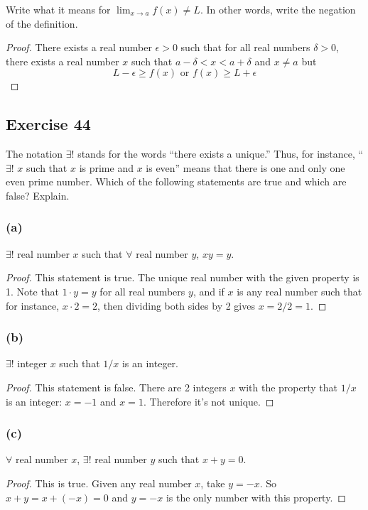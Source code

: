 \documentclass[14pt]{extarticle}
\newcommand{\fa}{\forall}
\newcommand{\te}{\exists}
\begin{document}
Write what it means for $\lim_{x \to a} f(x) \neq L$. In other words, write the negation of the definition.

\begin{proof}
    There exists a real number $\epsilon > 0$ such that for all real numbers $\delta > 0$, there exists a real number $x$ such that $a - \delta < x < a + \delta$ and $x \neq a$ but
    $$
        L - \epsilon \geq f(x) \text{  or  } f(x) \geq L + \epsilon
    $$
\end{proof}

\subsection{Exercise 44}
The notation $\te$! stands for the words “there exists a unique.” Thus, for instance, “$\te$! $x$ such that $x$ is prime and $x$ is even” means that there is one and only one even prime number. Which of the following statements are true and which are false? Explain.

\subsubsection{(a)}
$\te$! real number $x$ such that $\fa$ real number $y$, $xy = y$.

\begin{proof}
    This statement is true. The unique real number with the given property is 1. Note that $1\cdot y = y$ for all real numbers $y$, and if $x$ is any real number such that for instance, $x\cdot 2 = 2$, then dividing both sides by 2 gives $x = 2/2 = 1$.
\end{proof}

\subsubsection{(b)}
$\te$! integer $x$ such that $1/x$ is an integer.

\begin{proof}
    This statement is false. There are 2 integers $x$ with the property that $1/x$ is an integer: $x = -1$ and $x = 1$. Therefore it's not unique.
\end{proof}

\subsubsection{(c)}
$\fa$ real number $x$, $\te$! real number $y$ such that $x + y = 0$.

\begin{proof}
    This is true. Given any real number $x$, take $y = -x$. So $x + y = x + (-x) = 0$ and $y = -x$ is the only number with this property.
\end{proof}
\end{document}
